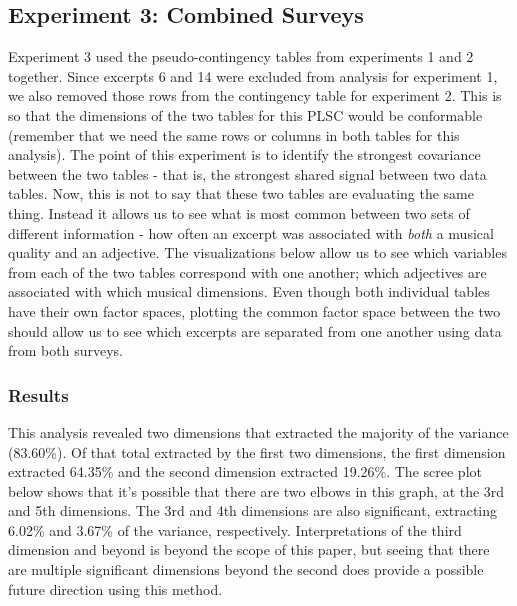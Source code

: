 \documentclass[
  english,
  man,floatsintext]{apa6}
\begin{document}
\hypertarget{experiment-3-combined-surveys}{%
\subsection{Experiment 3: Combined Surveys}\label{experiment-3-combined-surveys}}

Experiment 3 used the pseudo-contingency tables from experiments 1 and 2 together. Since excerpts 6 and 14 were excluded from analysis for experiment 1, we also removed those rows from the contingency table for experiment 2. This is so that the dimensions of the two tables for this PLSC would be conformable (remember that we need the same rows or columns in both tables for this analysis). The point of this experiment is to identify the strongest covariance between the two tables - that is, the strongest shared signal between two data tables. Now, this is not to say that these two tables are evaluating the same thing. Instead it allows us to see what is most common between two sets of different information - how often an excerpt was associated with \emph{both} a musical quality and an adjective. The visualizations below allow us to see which variables from each of the two tables correspond with one another; which adjectives are associated with which musical dimensions. Even though both individual tables have their own factor spaces, plotting the common factor space between the two should allow us to see which excerpts are separated from one another using data from both surveys.

\hypertarget{results-1}{%
\subsubsection{Results}\label{results-1}}

This analysis revealed two dimensions that extracted the majority of the variance (83.60\%). Of that total extracted by the first two dimensions, the first dimension extracted 64.35\% and the second dimension extracted 19.26\%. The scree plot below shows that it's possible that there are two elbows in this graph, at the 3rd and 5th dimensions. The 3rd and 4th dimensions are also significant, extracting 6.02\% and 3.67\% of the variance, respectively. Interpretations of the third dimension and beyond is beyond the scope of this paper, but seeing that there are multiple significant dimensions beyond the second does provide a possible future direction using this method.
\end{document}
